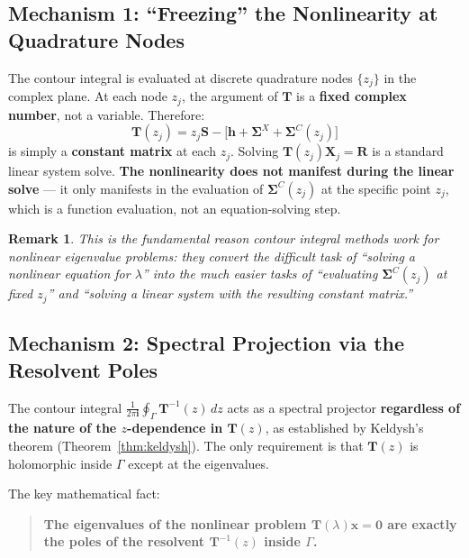 \documentclass[12pt,a4paper]{article}
\newtheorem{remark}[theorem]{Remark}
\theoremstyle{definition}
\newcommand{\key}[1]{\textcolor{keypoint}{\textbf{#1}}}
\begin{document}
\subsection{Mechanism 1: ``Freezing'' the Nonlinearity at Quadrature Nodes}

The contour integral is evaluated at discrete quadrature nodes $\{z_j\}$ in the complex plane. At each node $z_j$, the argument of $\mathbf{T}$ is a \textbf{fixed complex number}, not a variable. Therefore:
\begin{equation}
\mathbf{T}(z_j) = z_j\mathbf{S} - \bigl[\mathbf{h} + \mathbf{\Sigma}^{X} + \mathbf{\Sigma}^{C}(z_j)\bigr]
\end{equation}
is simply a \textbf{constant matrix} at each $z_j$. Solving $\mathbf{T}(z_j)\mathbf{X}_j = \mathbf{R}$ is a standard linear system solve. \textbf{The nonlinearity does not manifest during the linear solve} --- it only manifests in the evaluation of $\mathbf{\Sigma}^{C}(z_j)$ at the specific point $z_j$, which is a function evaluation, not an equation-solving step.

\begin{remark}
This is the fundamental reason contour integral methods work for nonlinear eigenvalue problems: they convert the difficult task of ``solving a nonlinear equation for $\lambda$'' into the much easier tasks of ``evaluating $\mathbf{\Sigma}^{C}(z_j)$ at fixed $z_j$'' and ``solving a linear system with the resulting constant matrix.''
\end{remark}

\subsection{Mechanism 2: Spectral Projection via the Resolvent Poles}

The contour integral $\frac{1}{2\pi\mathbf{i}} \oint_{\Gamma} \mathbf{T}^{-1}(z)\,dz$ acts as a spectral projector \textbf{regardless of the nature of the $z$-dependence in $\mathbf{T}(z)$}, as established by Keldysh's theorem (Theorem~\ref{thm:keldysh}). The only requirement is that $\mathbf{T}(z)$ is holomorphic inside $\Gamma$ except at the eigenvalues.

The key mathematical fact:
\begin{quote}
\key{The eigenvalues of the nonlinear problem $\mathbf{T}(\lambda)\mathbf{x} = \mathbf{0}$ are exactly the poles of the resolvent $\mathbf{T}^{-1}(z)$ inside $\Gamma$.}
\end{quote}
\end{document}
